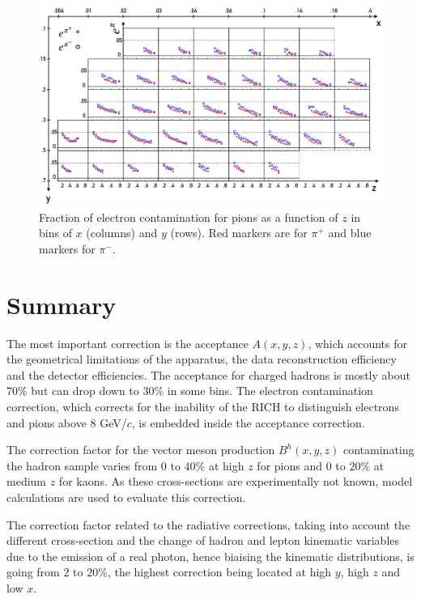 \begin{figure}
	\includegraphics[scale=0.7]{./gfx/econt.png}
	\caption{Fraction of electron contamination for pions as a function of $z$ in bins of $x$ (columns) and $y$ (rows). Red markers are for $\pi^+$ and blue markers for $\pi^-$.}
	\label{pic:epi}
\end{figure}

\section{Summary}

The most important correction is the acceptance $A(x,y,z)$, which accounts for the geometrical limitations of the apparatus, the data reconstruction efficiency and the detector efficiencies. The acceptance for charged hadrons is mostly about $70$\% but can drop down to $30$\% in some bins. The electron contamination correction, which corrects for the inability of the RICH to distinguish electrons and pions above $8$ GeV/$c$, is embedded inside the acceptance correction.

The correction factor for the vector meson production $B^h(x,y,z)$ contaminating the hadron sample varies from $0$ to $40$\% at high $z$ for pions and $0$ to $20$\% at medium $z$ for kaons. As these cross-sections are experimentally not known, model calculations are used to evaluate this correction.

The correction factor related to the radiative corrections, taking into account the different cross-section and the change of hadron and lepton kinematic variables due to the emission of a real photon, hence biaising the kinematic distributions, is going from $2$ to $20$\%, the highest correction being located at high $y$, high $z$ and low $x$.
